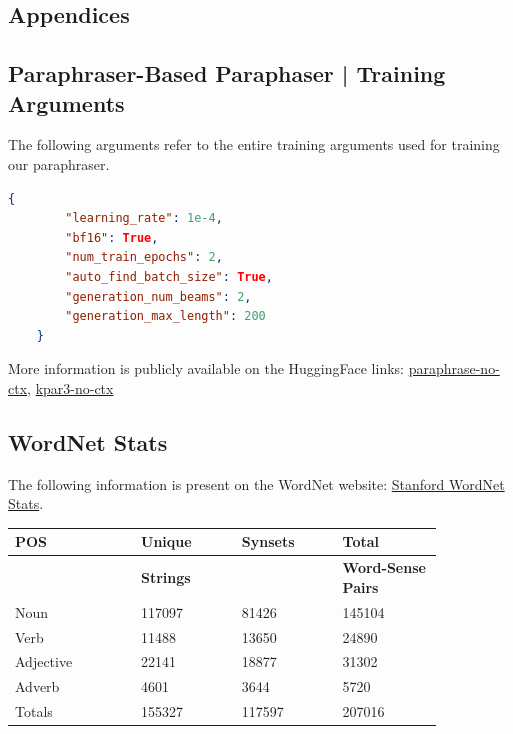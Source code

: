 \documentclass{l4proj}
\theoremstyle{definition}
\begin{document}

\begin{appendices}

\chapter{Appendices}
\section{Paraphraser-Based Paraphaser | Training Arguments}
    \label{append:training-args}
    The following arguments refer to the entire training arguments used for training our paraphraser.
    
    \begin{lstlisting}[language=json,firstnumber=1]
    {
        "learning_rate": 1e-4,
        "bf16": True,
        "num_train_epochs": 2,
        "auto_find_batch_size": True,
        "generation_num_beams": 2,
        "generation_max_length": 200
    }
    \end{lstlisting}
    More information is publicly available on the HuggingFace links: \href{https://huggingface.co/SamSJackson/paraphrase-dipper-no-ctx}{paraphrase-no-ctx}, \href{https://huggingface.co/datasets/SamSJackson/kpar3-no-ctx}{kpar3-no-ctx} 

\section{WordNet Stats}
    \label{append:wnet-stats}
    The following information is present on the WordNet website: \href{https://wordnet.princeton.edu/documentation/21-wnstats7wn}{Stanford WordNet Stats}.
    \begin{table}[ht]
        \centering
        \begin{tabular}{@{}p{0.25\linewidth}p{0.2\linewidth}p{0.2\linewidth}p{0.2\linewidth}@{}}
            \toprule
            \textbf{POS} & \textbf{Unique} & \textbf{Synsets} & \textbf{Total} \\ \midrule
             & \textbf{Strings} &  & \textbf{Word-Sense Pairs} \\ \midrule
            \multicolumn{1}{l|}{Noun} & 117097 & 81426 & 145104 \\
            \multicolumn{1}{l|}{Verb} & 11488 & 13650 & 24890 \\
            \multicolumn{1}{l|}{Adjective} & 22141 & 18877 & 31302 \\
            \multicolumn{1}{l|}{Adverb} & 4601 & 3644 & 5720 \\
            \multicolumn{1}{l|}{Totals} & 155327 & 117597 & 207016 \\ \bottomrule
        \end{tabular}
    \end{table}

\end{appendices}
\end{document}
